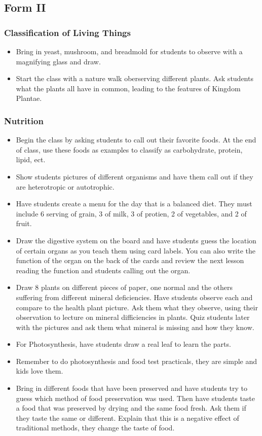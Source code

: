 \subsection{Form II}
\subsubsection{Classification of Living Things}
\begin{itemize}
\item Bring in yeast, mushroom, and breadmold for students to observe with a magnifying glass and draw.
\item Start the class with a nature walk oberserving different plants. Ask students what the plants all have in common, leading to the features of Kingdom Plantae.
\end{itemize}

\subsubsection{Nutrition}
\begin{itemize}
\item Begin the class by asking students to call out their favorite foods.  At the end of class, use these foods as examples to classify as carbohydrate, protein, lipid, ect.
\item Show students pictures of different organisms and have them call out if they are heterotropic or autotrophic.
\item Have students create a menu for the day that is a balanced diet. They must include 6 serving of grain, 3 of milk, 3 of protien, 2 of vegetables, and 2 of fruit.  
\item Draw the digestive system on the board and have students guess the location of certain organs as you teach them using card labels.  You can also write the function of the organ on the back of the cards and review the next lesson reading the function and students calling out the organ.
\item Draw 8 plants on different pieces of paper, one normal and the others suffering from different mineral deficiencies. Have students observe each and compare to the health plant picture.  Ask them what they observe, using their observation to lecture on mineral difficiencies in plants. Quiz students later with the pictures and ask them what mineral is missing and how they know.  
\item	For Photosynthesis, have students draw a real leaf to learn the parts.
\item Remember to do photosynthesis and food test practicals, they are simple and kids love them.
\item Bring in different foods that have been preserved and have students try to guess which method of food preservation was used. Then have students taste a food that was preserved by drying and the same food fresh.  Ask them if they taste the same or different. Explain that this is a negative effect of traditional methods, they change the taste of food.
\end{itemize}

